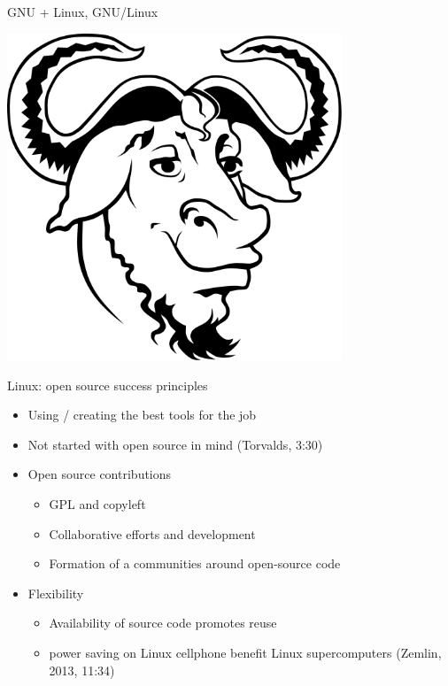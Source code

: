 \begin{frame}{GNU + Linux, GNU/Linux}
\begin{minipage}{0.45\textwidth}
\includegraphics[width = 0.75\textwidth]{gnu.png}
\end{minipage}
\end{frame}


\begin{frame}{Linux: open source success principles}
\begin{itemize}
 \item Using / creating the best tools for the job
 \item Not started with open source in mind (Torvalds, 3:30)
 \item Open source contributions
 \begin{itemize}
   \item GPL and copyleft
   \item Collaborative efforts and development
   \item Formation of a communities around open-source code
 \end{itemize}
 \item Flexibility
 \begin{itemize}
   \item Availability of source code promotes reuse
   \item power saving on Linux cellphone benefit Linux supercomputers (Zemlin, 2013, 11:34)
  \end{itemize}
\end{itemize}
\end{frame}



